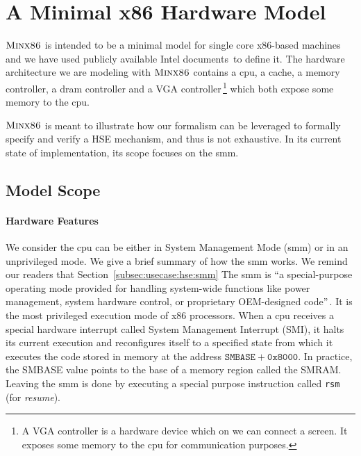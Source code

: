\section{A Minimal x86 Hardware Model}
\label{sec:speccert2:minx86}

$\textsc{Minx86}$ is intended to be a minimal model for single core x86-based
machines and we have used publicly available Intel
documents\,\cite{intel2013celeron,intel2009mch,intel2014manual} to define it.
%
The hardware architecture we are modeling with $\textsc{Minx86}$ contains a
\ac{cpu}, a cache, a memory controller, a \ac{dram} controller and a VGA
controller\,\footnote{A VGA controller is a hardware device which on we can
  connect a screen. It exposes some memory to the \ac{cpu} for communication
  purposes.} which both expose some memory to the \ac{cpu}.

$\textsc{Minx86}$ is meant to illustrate how our formalism can be leveraged
to formally specify and verify a HSE mechanism, and thus is not exhaustive.
%
In its current state of implementation, its scope focuses on the \ac{smm}.

\subsection{Model Scope}
\label{sec:speccert2:scope}

\paragraph{Hardware Features}
%
We consider the \ac{cpu} can be either in System Management Mode (\ac{smm}) or
in an unprivileged mode.
%
We give a brief summary of how the \ac{smm} works.
%
We remind our readers that Section~\ref{subsec:usecase:hse:smm}
%
The \ac{smm} is ``a special-purpose operating mode provided for handling
system-wide functions like power management, system hardware control, or
proprietary OEM-designed code''\,\cite{intel2014manual}.
%
It is the most privileged execution mode of x86 processors.
%
When a \ac{cpu} receives a special hardware interrupt called System Management
Interrupt (SMI), it halts its current execution and reconfigures itself to a
specified state from which it executes the code stored in memory at the address
$\mathtt{SMBASE} + \texttt{0x8000}$.
%
In practice, the SMBASE value points to the base of a memory region called the
SMRAM.
%
Leaving the \ac{smm} is done by executing a special purpose instruction called
\texttt{rsm} (for \emph{resume}).

